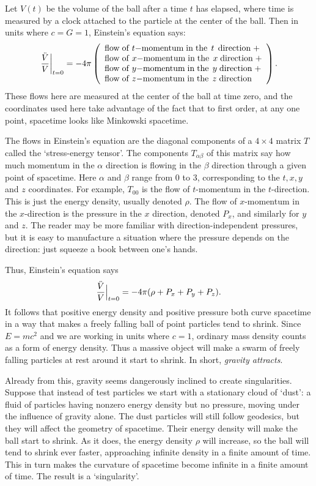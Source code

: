 \documentclass[12pt]{article}
\begin{document}
Let $V(t)$ be the volume of the ball after a time $t$ has elapsed, where time is measured by a clock attached to the particle at the center of the ball.  Then in units where $c = G = 1$, Einstein's equation says: 
\[ \left.{\ddot V\over V} \right|_{t = 0} =
 -4\pi \left( \begin{array}{l} 
{\rm flow \; of \;} t{\rm -momentum \; in \; the \;\,} t {\rm \,\; direction \;} + \\ 
{\rm flow \; of \;} x{\rm -momentum \; in \; the \;\,} x {\rm \; direction \;} + \\ 
{\rm flow \; of \;} y{\rm -momentum \; in \; the \;\,} y {\rm \; direction \;} + \\ 
{\rm flow \; of \;} z{\rm -momentum \; in \; the \;\,} z {\rm \; direction} 
\end{array} \right) .\] 
These flows here are measured at the center of the ball at time zero, and the coordinates used here take advantage of the fact that to first order, at any one point, spacetime looks like Minkowski spacetime.  

The flows in Einstein's equation are the diagonal components of a $4 \times 4$ matrix $T$ called the `stress-energy tensor'.  The components $T_{\alpha \beta}$ of this matrix say how much momentum in the $\alpha$ direction is flowing in the $\beta$ direction through a given point of spacetime.   Here $\alpha$ and $\beta$ range from $0$ to $3$, corresponding to the $t,x,y$ and $z$ coordinates.  For example, $T_{00}$ is the flow of $t$-momentum in the $t$-direction.  This is just the energy density, usually denoted $\rho$.  The flow of $x$-momentum in the $x$-direction is the pressure in the $x$ direction, denoted $P_x$, and similarly for $y$ and $z$.   The reader may be more familiar with direction-independent pressures, but it is easy to manufacture a situation where the pressure depends on the direction: just squeeze a book between one's hands.   

Thus, Einstein's equation says
\[   {\ddot V\over V} \Bigr|_{t = 0} 
= -4\pi (\rho + P_x + P_y + P_z).  \]
It follows that positive energy density and positive pressure both curve spacetime in a way that makes a freely falling ball of point particles tend to shrink.  Since $E = mc^2$ and we are working in units where $c = 1$, ordinary mass density counts as a form of energy density.  Thus a massive object will make a swarm of freely falling particles at rest around it start to shrink.  In short, \emph{gravity attracts}.

Already from this, gravity seems dangerously inclined to create singularities.  Suppose that instead of test particles we start with a stationary cloud of `dust': a fluid of particles having nonzero energy density but no pressure, moving under the influence of gravity alone.  The dust particles will still follow geodesics, but they will affect the geometry of spacetime.  Their energy density will make the ball start to shrink.  As it does, the energy density $\rho$ will increase, so the ball will tend to shrink ever faster, approaching infinite density in a finite amount of time.   This in turn makes the curvature of spacetime become infinite in a finite amount of time.  The result is a `singularity'. 
\end{document}
